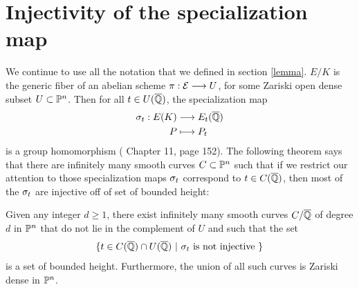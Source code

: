 \documentclass[12pt,reqno]{amsart}
\begin{document}
\section{Injectivity of the specialization map} 
We continue to use all the notation that we defined in section \ref{lemma}. $E/K$ is the generic fiber of an abelian scheme $\pi : {\mathcal E} \longrightarrow U$, for some Zariski open dense subset $U \subset \mathbb{P}^n$. Then for all $t \in U(\overline{\mathbb{Q}})$, the specialization map
\begin{align*}
\sigma_t : E(K) &\longrightarrow E_t(\overline{\mathbb{Q}}) \\
P &\longmapsto P_t
\end{align*} is a group homomorphism (\cite{SLM} Chapter 11, page 152). The following theorem says that there are infinitely many smooth curves $C \subset \mathbb{P}^n$ such that if we restrict our attention to those specialization maps $\sigma_t$ correspond to $t \in C(\overline{\mathbb{Q}})$, then most of the $\sigma_t$ are injective off of set of bounded height:

\begin{theoremB} Given any integer $d \geq 1$, there exist infinitely many smooth curves $C/\overline{\mathbb{Q}}$ of degree $d$ in $\mathbb{P}^n$ that do not lie in the complement of $U$ and such that the set 
$$\{ t \in C(\overline{\mathbb{Q}}) \cap U(\overline{\mathbb{Q}}) \ | \ \sigma_t \text{ is not injective }\} $$
is a set of bounded height. Furthermore, the union of all such curves is Zariski dense in $\mathbb{P}^n$.
\end{theoremB} 
\end{document}
